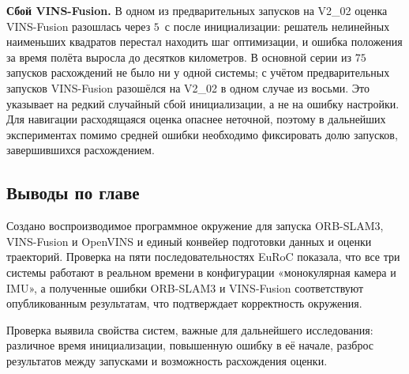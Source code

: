     \textbf{Сбой VINS-Fusion.}
    В одном из предварительных запусков на V2\_02 оценка VINS-Fusion разошлась через $5$~с после инициализации: решатель нелинейных наименьших квадратов перестал находить шаг оптимизации, и ошибка положения за время полёта выросла до десятков километров.
    В основной серии из $75$ запусков расхождений не было ни у одной системы; с учётом предварительных запусков VINS-Fusion разошёлся на V2\_02 в одном случае из восьми.
    Это указывает на редкий случайный сбой инициализации, а не на ошибку настройки.
    Для навигации расходящаяся оценка опаснее неточной, поэтому в дальнейших экспериментах помимо средней ошибки необходимо фиксировать долю запусков, завершившихся расхождением.

    \subsection{Выводы по главе}

    Создано воспроизводимое программное окружение для запуска ORB-SLAM3, VINS-Fusion и OpenVINS и единый конвейер подготовки данных и оценки траекторий.
    Проверка на пяти последовательностях EuRoC показала, что все три системы работают в реальном времени в конфигурации «монокулярная камера и IMU», а полученные ошибки ORB-SLAM3 и VINS-Fusion соответствуют опубликованным результатам, что подтверждает корректность окружения.

    Проверка выявила свойства систем, важные для дальнейшего исследования: различное время инициализации, повышенную ошибку в её начале, разброс результатов между запусками и возможность расхождения оценки.
    \clearpage
